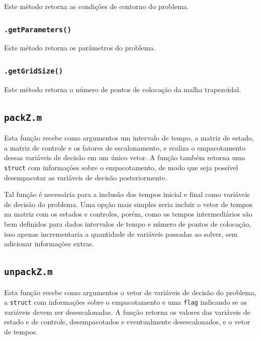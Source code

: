 Este método retorna as condições de contorno do problema.

\subsubsection{\texttt{.getParameters()}}
\label{subsubsec:getparameters}

Este método retorna os parâmetros do problema.

\subsubsection{\texttt{.getGridSize()}}
\label{subsubsec:getgridsize}

Este método retorna o número de pontos de colocação da malha trapezoidal.

\subsection{\texttt{packZ.m}}
\label{subsec:packz}

Esta função recebe como argumentos um intervalo de tempo, a matriz de estado, a matriz de controle e os fatores de escalonamento, e realiza o empacotamento dessas variáveis de decisão em um único vetor. A função também retorna uma \texttt{struct} com informações sobre o empacotamento, de modo que seja possível desempacotar as variáveis de decisão posteriormente.

Tal função é necessária para a inclusão dos tempos inicial e final como variáveis de decisão do problema. Uma opção mais simples seria incluir o vetor de tempos na matriz com os estados e controles, porém, como os tempos intermediários são bem definidos para dados intervalos de tempo e número de pontos de colocação, isso apenas incrementaria a quantidade de variáveis passadas ao solver, sem adicionar informações extras.

\subsection{\texttt{unpackZ.m}}
\label{subsec:unpackz}

Esta função recebe como argumentos o vetor de variáveis de decisão do problema, a \texttt{struct} com informações sobre o empacotamento e uma \texttt{flag} indicando se as variáveis devem ser desescalonadas. A função retorna os valores das variáveis de estado e de controle, desempacotados e eventualmente desescalonados, e o vetor de tempos.

